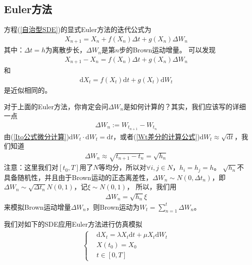     \subsection{Euler方法}
        \label{subsec:Euler方法}
        方程(\ref{自治型SDE})的显式Euler方法的迭代公式为
        \begin{align*}
            X_{n+1} = X_n + f(X_n)\Delta t +g(X_n)\Delta W_n
        \end{align*}
        其中：$\Delta t = h$为离散步长，$\Delta W_n$是第$n$步的Brown运动增量。
        可以发现
        \begin{align*}
            X_{n+1} - X_n = f(X_n)\Delta t +g(X_n)\Delta W_n
        \end{align*}
        和
        \begin{align*}
            \mathrm{d}X_t = f(X_t)\mathrm{d}t + g(X_t)\mathrm{d}W_t
        \end{align*}
        是近似相同的。
        \par
        对于上面的Euler方法，你肯定会问$\Delta W_n $是如何计算的？其实，我们应该写的详细一点
        \begin{align*}
            \Delta W_n :=  W_{t_{n+1}} - W_{t_n}
        \end{align*}
        由(\ref{Ito公式微分计算})$\mathrm{d}W_t \cdot\mathrm{d}W_t = \mathrm{d}t$，或者(\ref{Wt差分的计算公式})$\mathrm{d}W_t \approx \sqrt{\mathrm{d}t}$，我们知道
        \begin{align*}
            \Delta W_n \approx\sqrt{t_{n+1} - t_n} = \sqrt{h_n}
        \end{align*}
        注意：这里我们对$[t_0,T]$用了$N$等均分，所以对$\forall i,j \in N$，$h_i = h_j = h$。
        $\sqrt{h_n}$不具备随机性，并且由于Brown运动的正态离差性，$\Delta W_n \sim N(0,\Delta t_n)$，即$\Delta W_n \sim \sqrt{\Delta t_n} N(0,1)$，记$\xi\sim N(0,1)$，
        所以，我们用
        \begin{align*}
            \Delta W_n = \sqrt{h_n} \xi
        \end{align*}
        来模拟Brown运动增量$\Delta W_n$，则Brown运动为$W_t = \sum_{n = 1}^t \Delta W_n$。
        \par
        我们对如下的SDE应用Euler方法进行仿真模拟
        \begin{align*}
            \left\{
                \begin{aligned}
                &\mathrm{d}X_t = \lambda X_t \mathrm{d}t+\mu X_t\mathrm{d}W_t\\
                &X(t_0) = X_0\\
                &t\in[0,T]
                \end{aligned}
            \right.
        \end{align*}
